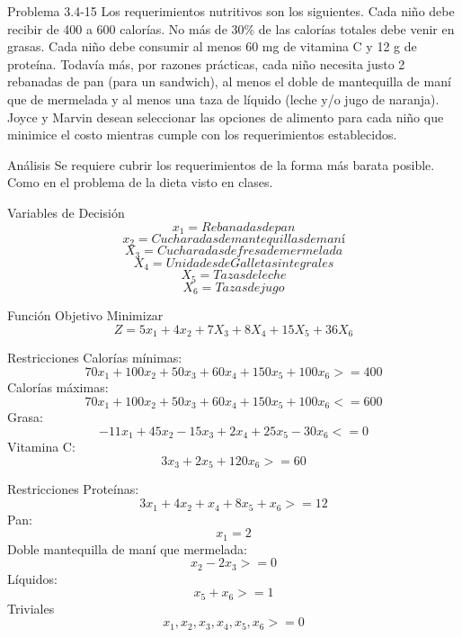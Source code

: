 \documentclass{beamer}
\begin{document}
\begin{frame}[t,fragile]{Problema 3.4-15 }
Los requerimientos nutritivos son los siguientes. Cada niño debe recibir de 400 a 600 calorías. No más de 30\% de las calorías totales debe venir en grasas. Cada niño debe consumir al menos 60 mg de vitamina C y 12 g de proteína. Todavía más, por razones prácticas, cada niño necesita justo 2 rebanadas de pan (para un sandwich), al menos el doble de mantequilla de maní que de mermelada y al menos una taza de líquido (leche y/o jugo de naranja). 
Joyce y Marvin desean seleccionar las opciones de alimento para cada niño que minimice el costo mientras cumple con los requerimientos establecidos.
\end{frame}
\begin{frame}[fragile]{Análisis}
Se requiere cubrir los requerimientos de la forma más barata posible. Como en el problema de la dieta visto en clases.

\end{frame}
\begin{frame}[fragile]{Variables de Decisión}
\[x_{1} = Rebanadas de pan\]
\[x_{2} = Cucharadas de mantequillas de maní\]
\[X_{3} = Cucharadas de fresa de mermelada\]
\[X_{4} = Unidades de Galletas integrales\]
\[X_{5} = Tazas de leche\]
\[X_{6} = Tazas de jugo\]

\end{frame}

\begin{frame}[fragile]{Función Objetivo}
Minimizar\\
\[Z = 5x_{1} + 4x_{2} +7X_{3} + 8X_{4} + 15X_{5} +36X_{6}\]
\end{frame}

\begin{frame}[fragile]{Restricciones}
Calorías mínimas:\\
\[70x_{1} + 100x_{2} + 50x_{3} + 60x_{4} + 150x_{5} + 100x_{6} >= 400\]
Calorías máximas:
\[70x_{1} + 100x_{2} + 50x_{3} + 60x_{4} + 150x_{5} + 100x_{6} <= 600\]
Grasa:\\
\[-11x_{1} + 45x_{2} - 15x_{3} + 2x_{4} + 25x_{5} - 30x_{6}  <=  0\]
Vitamina C:\\
\[3x_{3} + 2x_{5} + 120x_{6} >= 60\]
\end{frame}
\begin{frame}[fragile]{Restricciones}
Proteínas:\\
\[3x_{1} + 4x_{2} + x_{4} + 8x_{5} + x_{6} >= 12\]
Pan:
\[x_{1} = 2\]
Doble mantequilla de maní que mermelada:\\
\[x_{2} - 2x_{3} >= 0\]
Líquidos:\\
\[x_{5} + x_{6} >= 1 \]
Triviales\\
 \[x_{1}, x_{2}, x_{3}, x_{4}, x_{5}, x_{6} >= 0\]

\end{frame}
\end{document}

